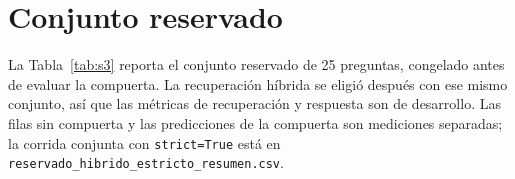 \documentclass[journal]{IEEEtran}
\begin{document}
\begin{table}[H]
\centering
\footnotesize
\caption{Fases 6 y 7: variantes probadas sobre 38 preguntas. La referencia es el top-5 con reranker.}
\label{tab:s2}
\end{table}

\section*{Conjunto reservado}

La Tabla~\ref{tab:s3} reporta el conjunto reservado de 25 preguntas, congelado antes de evaluar la compuerta. La recuperaci\'on h\'ibrida se eligi\'o despu\'es con ese mismo conjunto, as\'i que las m\'etricas de recuperaci\'on y respuesta son de desarrollo. Las filas sin compuerta y las predicciones de la compuerta son mediciones separadas; la corrida conjunta con \texttt{strict=True} est\'a en \texttt{reservado\_hibrido\_estricto\_resumen.csv}.
\end{document}
